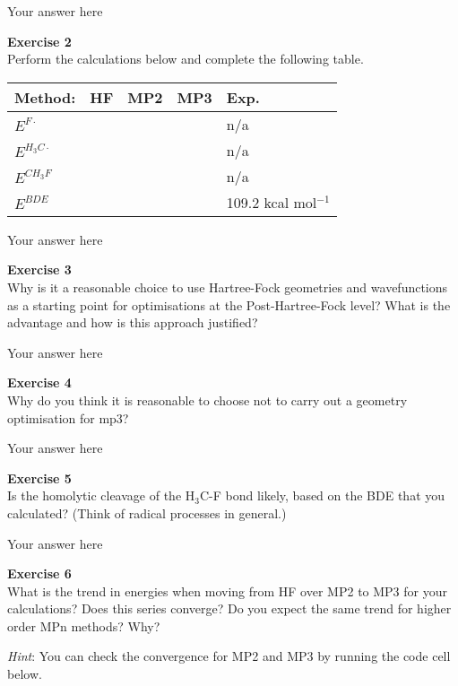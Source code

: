 \documentclass{article}
\begin{document}
Your answer here

\begin{mdframed}
\textbf{Exercise 2}\\
Perform the calculations below and complete the following table.

\bigskip\noindent
\begin{tabular}{p{}p{}p{}p{}p{}}
\toprule
Method: & HF & MP2 & MP3 & Exp. \\
\hline
$E^{F\cdot}$ &  &  &  & n/a \\
$E^{H_3C\cdot}$ &  &  &  & n/a \\
$E^{CH_3F}$ &  &  &  & n/a \\
$E^{BDE}$ &  &  &  & 109.2 kcal mol$^{ -1}$ \\
\bottomrule
\end{tabular}

\bigskip
\end{mdframed}

Your answer here

\begin{mdframed}
\textbf{Exercise 3}\\
Why is it a reasonable choice to use Hartree-Fock geometries and
wavefunctions as a starting point for optimisations at the
Post-Hartree-Fock level? What is the advantage and how is this
approach justified?
\end{mdframed}

Your answer here

\begin{mdframed}
\textbf{Exercise 4}\\
Why do you think it is reasonable to choose not to carry out a geometry optimisation for mp3?
\end{mdframed}

Your answer here

\begin{mdframed}
\textbf{Exercise 5}\\
Is the homolytic cleavage of the H$_3$C-F bond likely, based on the
BDE that you calculated? (Think of radical processes in general.)
\end{mdframed}

Your answer here

\begin{mdframed}
\textbf{Exercise 6}\\
What is the trend in energies when moving from HF over MP2 to MP3 for your calculations? Does this series converge? Do you expect the same trend for higher order MPn methods? Why?

\textit{Hint}: You can check the convergence for MP2 and MP3 by running the code cell below.
\end{mdframed}
\end{document}
